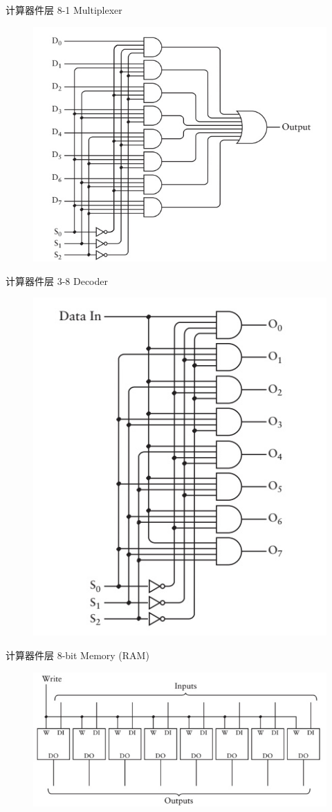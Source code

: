 \documentclass[UTF8]{ctexbeamer}
\begin{document}
\begin{frame}{计算器件层}
8-1 Multiplexer
\begin{figure}
\centering
\includegraphics[width=0.6\linewidth]{fig/Lecture2/8-1mux.jpg}
\end{figure}
\end{frame}

\begin{frame}{计算器件层}
3-8 Decoder
\begin{figure}
\centering
\includegraphics[width=0.5\linewidth]{fig/Lecture2/3-8decoder.jpg}
\end{figure}
\end{frame}

\begin{frame}{计算器件层}
8-bit Memory (RAM)
\begin{figure}
\centering
\includegraphics[width=0.8\linewidth]{fig/Lecture2/8bit-latch.jpg}
\end{figure}
\end{frame}
\end{document}
